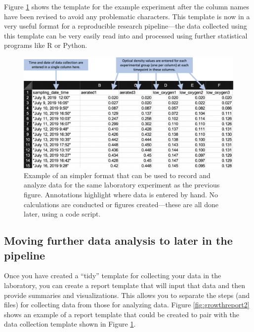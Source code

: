\documentclass[]{tufte-book}
\begin{document}
Figure \ref{fig:growthsimple2} shows the template for the example experiment after the
column names have been revised to avoid any problematic characters. This template is now in
a very useful format for a reproducible research pipeline---the data collected using this
template can be very easily read into and processed using further statistical programs like
R or Python.

\begin{figure}
\includegraphics[width=\textwidth]{figures/growth_curve_simple} \caption[Example of an simpler format that can be used to record and analyze data for the same laboratory experiment as the previous figure]{Example of an simpler format that can be used to record and analyze data for the same laboratory experiment as the previous figure. Annotations highlight where data is entered by hand. No calculations are conducted or figures created---these are all done later, using a code script.}\label{fig:growthsimple2}
\end{figure}

\hypertarget{moving-further-data-analysis-to-later-in-the-pipeline}{%
\subsection{Moving further data analysis to later in the pipeline}\label{moving-further-data-analysis-to-later-in-the-pipeline}}

Once you have created a ``tidy'' template for collecting your data in the laboratory,
you can create a report template that will input that data and then provide summaries
and visualizations. This allows you to separate the steps (and files) for collecting data
from those for analyzing data. Figure \ref{fig:growthreport2} shows an example of
a report template that could be created to pair with the data collection template shown
in Figure \ref{fig:growthsimple2}.
\end{document}
